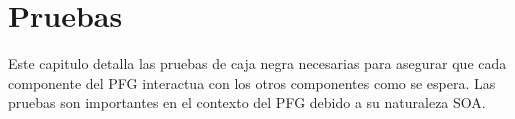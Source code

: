 \chapter{Pruebas}
Este capitulo detalla las pruebas de caja negra necesarias para asegurar que cada componente del PFG interactua con los otros componentes como se espera. Las pruebas son importantes en el contexto del PFG debido a su naturaleza SOA.
